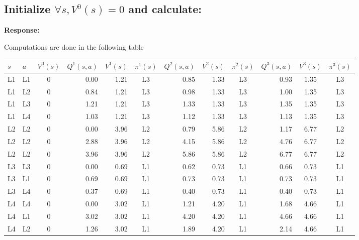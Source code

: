 \documentclass[12pt, letterpaper]{article}
\begin{document}
\subsection{Initialize $\forall s,V^0(s)=0$ and calculate:}

\textbf{Response:}

Computations are done in the following table

\begin{center}
    \begin{tabular}{|l|l|c|r|r|c|r|r|c|r|c|c|}
    \hline
    $s$ & $a$  & $V^0(s)$ & $Q^1(s,a)$ & $V^1(s)$ & $\pi^1(s)$ & $Q^2(s,a)$ & $V^2(s)$ & $\pi^2(s)$ & $Q^3(s,a)$ & $V^3(s)$ & $\pi^3(s)$ \\ \hline
    L1         & L1 & 0      & 0.00    & 1.21  & L3      & 0.85    & 1.33  & L3      & 0.93    & 1.35  & L3      \\ \hline
    L1         & L2 & 0      & 0.84    & 1.21  & L3      & 0.98    & 1.33  & L3      & 1.00    & 1.35  & L3      \\ \hline
    L1         & L3 & 0      & 1.21    & 1.21  & L3      & 1.33    & 1.33  & L3      & 1.35    & 1.35  & L3      \\ \hline
    L1         & L4 & 0      & 1.03    & 1.21  & L3      & 1.12    & 1.33  & L3      & 1.13    & 1.35  & L3      \\ \hline
    L2         & L2 & 0      & 0.00    & 3.96  & L2      & 0.79    & 5.86  & L2      & 1.17    & 6.77  & L2      \\ \hline
    L2         & L2 & 0      & 2.88    & 3.96  & L2      & 4.15    & 5.86  & L2      & 4.76    & 6.77  & L2      \\ \hline
    L2         & L2 & 0      & 3.96    & 3.96  & L2      & 5.86    & 5.86  & L2      & 6.77    & 6.77  & L2      \\ \hline
    L3         & L3 & 0      & 0.00    & 0.69  & L1      & 0.62    & 0.73  & L1      & 0.66    & 0.73  & L1      \\ \hline
    L3         & L1 & 0      & 0.69    & 0.69  & L1      & 0.73    & 0.73  & L1      & 0.73    & 0.73  & L1      \\ \hline
    L3         & L4 & 0      & 0.37    & 0.69  & L1      & 0.40    & 0.73  & L1      & 0.40    & 0.73  & L1      \\ \hline
    L4         & L4 & 0      & 0.00    & 3.02  & L1      & 1.21    & 4.20  & L1      & 1.68    & 4.66  & L1      \\ \hline
    L4         & L1 & 0      & 3.02    & 3.02  & L1      & 4.20    & 4.20  & L1      & 4.66    & 4.66  & L1      \\ \hline
    L4         & L2 & 0      & 1.26    & 3.02  & L1      & 1.89    & 4.20  & L1      & 2.14    & 4.66  & L1      \\ \hline
    \end{tabular}
\end{center}
\end{document}
